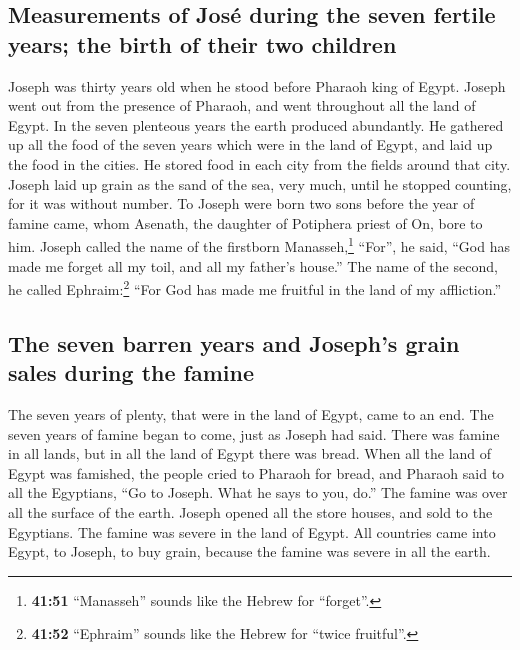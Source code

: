 \hypertarget{measurements-of-josuxe9-during-the-seven-fertile-years-the-birth-of-their-two-children}{%
\subsection{Measurements of José during the seven fertile years; the
birth of their two
children}\label{measurements-of-josuxe9-during-the-seven-fertile-years-the-birth-of-their-two-children}}

 Joseph was thirty years old when he stood before Pharaoh
king of Egypt. Joseph went out from the presence of Pharaoh, and went
throughout all the land of Egypt.  In the seven plenteous
years the earth produced abundantly.  He gathered up all
the food of the seven years which were in the land of Egypt, and laid up
the food in the cities. He stored food in each city from the fields
around that city.  Joseph laid up grain as the sand of
the sea, very much, until he stopped counting, for it was without
number.  To Joseph were born two sons before the year of
famine came, whom Asenath, the daughter of Potiphera priest of On, bore
to him.  Joseph called the name of the firstborn
Manasseh,\footnote{\textbf{41:51} ``Manasseh'' sounds like the Hebrew
  for ``forget''.} ``For'', he said, ``God has made me forget all my
toil, and all my father's house.''  The name of the
second, he called Ephraim:\footnote{\textbf{41:52} ``Ephraim'' sounds
  like the Hebrew for ``twice fruitful''.} ``For God has made me
fruitful in the land of my affliction.''

\hypertarget{the-seven-barren-years-and-josephs-grain-sales-during-the-famine}{%
\subsection{The seven barren years and Joseph's grain sales during the
famine}\label{the-seven-barren-years-and-josephs-grain-sales-during-the-famine}}

 The seven years of plenty, that were in the land of
Egypt, came to an end.  The seven years of famine began
to come, just as Joseph had said. There was famine in all lands, but in
all the land of Egypt there was bread.  When all the land
of Egypt was famished, the people cried to Pharaoh for bread, and
Pharaoh said to all the Egyptians, ``Go to Joseph. What he says to you,
do.''  The famine was over all the surface of the earth.
Joseph opened all the store houses, and sold to the Egyptians. The
famine was severe in the land of Egypt.  All countries
came into Egypt, to Joseph, to buy grain, because the famine was severe
in all the earth.


